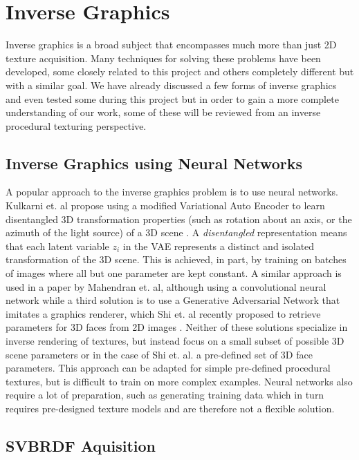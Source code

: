 \section{Inverse Graphics}\label{sec:BackgroundInverseGraphics}
Inverse graphics is a broad subject that encompasses much more than just 2D texture acquisition. Many techniques for solving these problems have been developed, some closely related to this project and others completely different but with a similar goal. We have already discussed a few forms of inverse graphics and even tested some during this project but in order to gain a more complete understanding of our work, some of these will be reviewed from an inverse procedural texturing perspective.

\subsection{Inverse Graphics using Neural Networks}

A popular approach to the inverse graphics problem is to use neural networks. Kulkarni et. al propose using a modified Variational Auto Encoder to learn disentangled 3D transformation properties (such as rotation about an axis, or the azimuth of the light source) of a 3D scene \cite{kulkarni_2015_deep}. A \textit{disentangled} representation means that each latent variable $z_i$ in the VAE represents a distinct and isolated transformation of the 3D scene. This is achieved, in part, by training on batches of images where all but one parameter are kept constant. A similar approach is used in a paper by Mahendran et. al, although using a convolutional neural network \cite{mahendran_2017_3d} while a third solution is to use a Generative Adversarial Network that imitates a graphics renderer, which Shi et. al recently proposed to retrieve parameters for 3D faces from 2D images \cite{shi_2019_facetoparameter}. Neither of these solutions specialize in inverse rendering of textures, but instead focus on a small subset of possible 3D scene parameters or in the case of Shi et. al. a pre-defined set of 3D face parameters. This approach can be adapted for simple pre-defined procedural textures, but is difficult to train on more complex examples. Neural networks also require a lot of preparation, such as generating training data which in turn requires pre-designed texture models and are therefore not a flexible solution.

\subsection{SVBRDF Aquisition}

